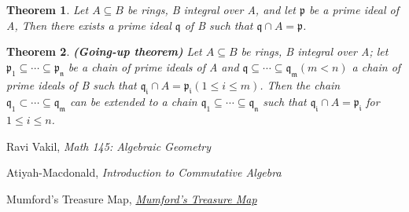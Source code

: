 \documentclass[]{report}
\newtheorem{theorem}{Theorem}[section]
\begin{document}
\begin{theorem}
    Let $A\subseteq B$ be rings, B integral over A, and let $\mathfrak{p}$ be a prime ideal of A, Then there exists a prime ideal $\mathfrak{q}$ of B such that $\mathfrak{q}\cap A = \mathfrak{p}$. 
\end{theorem}

\begin{theorem}
    \textbf{(Going-up theorem)} Let $A \subseteq B$ be rings, B integral over A; let $\mathfrak{p_1 \subseteq \cdots \subseteq p_n}$ be a chain of prime ideals of A and $\mathfrak{q \subseteq \cdots \subseteq q_m} (m < n )$ a chain of prime ideals of B such that $\mathfrak{q_i} \cap A = \mathfrak{p_i} (1 \leq i \leq m)$. Then the chain $\mathfrak{q_1 \subset \cdots \subseteq q_m}$ can be extended to a chain $\mathfrak{q_1 \subseteq \cdots \subseteq q_n}$ such that $\mathfrak{q_i} \cap A = \mathfrak{p_i}$ for $1 \leq i \leq n$.
\end{theorem}

\begin{thebibliography}{9}

    Ravi Vakil,
    \textit{Math 145: Algebraic Geometry}

    Atiyah-Macdonald, 
    \textit{Introduction to Commutative Algebra}

    Mumford's Treasure Map,
    \href{https://web.archive.org/web/20201130150255/http://www.neverendingbooks.org/mumfords-treasure-map}{\textit{Mumford's Treasure Map}}
\end{thebibliography}
\end{document}

